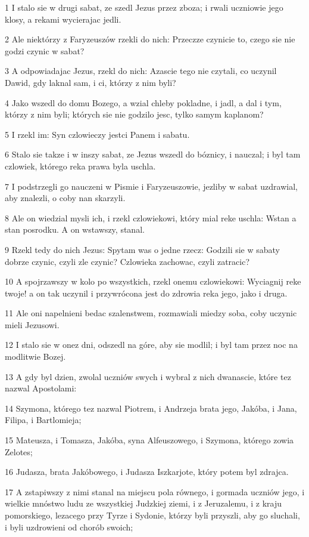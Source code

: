 \par 1 I stalo sie w drugi sabat, ze szedl Jezus przez zboza; i rwali uczniowie jego klosy, a rekami wycierajac jedli.
\par 2 Ale niektórzy z Faryzeuszów rzekli do nich: Przeczze czynicie to, czego sie nie godzi czynic w sabat?
\par 3 A odpowiadajac Jezus, rzekl do nich: Azascie tego nie czytali, co uczynil Dawid, gdy laknal sam, i ci, którzy z nim byli?
\par 4 Jako wszedl do domu Bozego, a wzial chleby pokladne, i jadl, a dal i tym, którzy z nim byli; których sie nie godzilo jesc, tylko samym kaplanom?
\par 5 I rzekl im: Syn czlowieczy jestci Panem i sabatu.
\par 6 Stalo sie takze i w inszy sabat, ze Jezus wszedl do bóznicy, i nauczal; i byl tam czlowiek, którego reka prawa byla uschla.
\par 7 I podstrzegli go nauczeni w Pismie i Faryzeuszowie, jezliby w sabat uzdrawial, aby znalezli, o coby nan skarzyli.
\par 8 Ale on wiedzial mysli ich, i rzekl czlowiekowi, który mial reke uschla: Wstan a stan posrodku. A on wstawszy, stanal.
\par 9 Rzekl tedy do nich Jezus: Spytam was o jedne rzecz: Godzili sie w sabaty dobrze czynic, czyli zle czynic? Czlowieka zachowac, czyli zatracic?
\par 10 A spojrzawszy w kolo po wszystkich, rzekl onemu czlowiekowi: Wyciagnij reke twoje! a on tak uczynil i przywrócona jest do zdrowia reka jego, jako i druga.
\par 11 Ale oni napelnieni bedac szalenstwem, rozmawiali miedzy soba, coby uczynic mieli Jezusowi.
\par 12 I stalo sie w onez dni, odszedl na góre, aby sie modlil; i byl tam przez noc na modlitwie Bozej.
\par 13 A gdy byl dzien, zwolal uczniów swych i wybral z nich dwanascie, które tez nazwal Apostolami:
\par 14 Szymona, którego tez nazwal Piotrem, i Andrzeja brata jego, Jakóba, i Jana, Filipa, i Bartlomieja;
\par 15 Mateusza, i Tomasza, Jakóba, syna Alfeuszowego, i Szymona, którego zowia Zelotes;
\par 16 Judasza, brata Jakóbowego, i Judasza Iszkarjote, który potem byl zdrajca.
\par 17 A zstapiwszy z nimi stanal na miejscu pola równego, i gormada uczniów jego, i wielkie mnóstwo ludu ze wszystkiej Judzkiej ziemi, i z Jeruzalemu, i z kraju pomorskiego, lezacego przy Tyrze i Sydonie, którzy byli przyszli, aby go sluchali, i byli uzdrowieni od chorób swoich;
